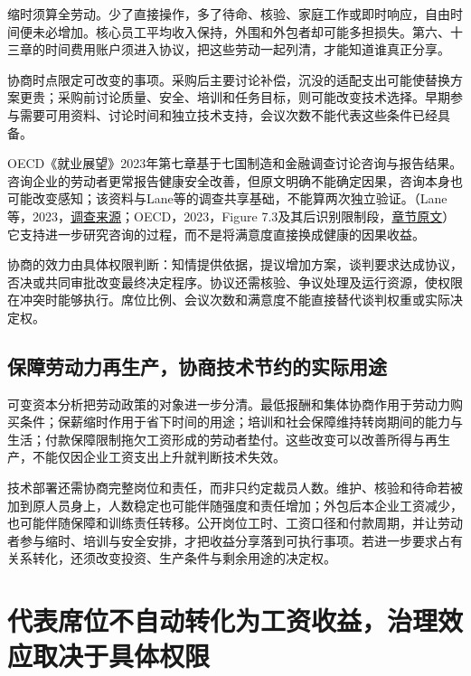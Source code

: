 \documentclass[UTF8,fontset=windows,12pt,a4paper,oneside,openany]{ctexbook}
\begin{document}
缩时须算全劳动。少了直接操作，多了待命、核验、家庭工作或即时响应，自由时间便未必增加。核心员工平均收入保持，外围和外包者却可能多担损失。第六、十三章的时间费用账户须进入协议，把这些劳动一起列清，才能知道谁真正分享。

协商时点限定可改变的事项。采购后主要讨论补偿，沉没的适配支出可能使替换方案更贵；采购前讨论质量、安全、培训和任务目标，则可能改变技术选择。早期参与需要可用资料、讨论时间和独立技术支持，会议次数不能代表这些条件已经具备。

OECD《就业展望》2023年第七章基于七国制造和金融调查讨论咨询与报告结果。咨询企业的劳动者更常报告健康安全改善，但原文明确不能确定因果，咨询本身也可能改变感知；该资料与Lane等的调查共享基础，不能算两次独立验证。（Lane等，2023，\href{https://doi.org/10.1787/ea0a0fe1-en}{调查来源}；OECD，2023，Figure 7.3及其后识别限制段，\href{https://www.oecd.org/en/publications/2023/07/oecd-employment-outlook-2023_904bcef3/full-report/social-dialogue-and-collective-bargaining-in-the-age-of-artificial-intelligence_5828691a.html}{章节原文}）它支持进一步研究咨询的过程，而不是将满意度直接换成健康的因果收益。

协商的效力由具体权限判断：知情提供依据，提议增加方案，谈判要求达成协议，否决或共同审批改变最终决定程序。协议还需核验、争议处理及运行资源，使权限在冲突时能够执行。席位比例、会议次数和满意度不能直接替代谈判权重或实际决定权。

\subsection{保障劳动力再生产，协商技术节约的实际用途}

可变资本分析把劳动政策的对象进一步分清。最低报酬和集体协商作用于劳动力购买条件；保薪缩时作用于省下时间的用途；培训和社会保障维持转岗期间的能力与生活；付款保障限制拖欠工资形成的劳动者垫付。这些改变可以改善所得与再生产，不能仅因企业工资支出上升就判断技术失效。

技术部署还需协商完整岗位和责任，而非只约定裁员人数。维护、核验和待命若被加到原人员身上，人数稳定也可能伴随强度和责任增加；外包后本企业工资减少，也可能伴随保障和训练责任转移。公开岗位工时、工资口径和付款周期，并让劳动者参与缩时、培训与安全安排，才把收益分享落到可执行事项。若进一步要求占有关系转化，还须改变投资、生产条件与剩余用途的决定权。

\section{代表席位不自动转化为工资收益，治理效应取决于具体权限}
\end{document}
